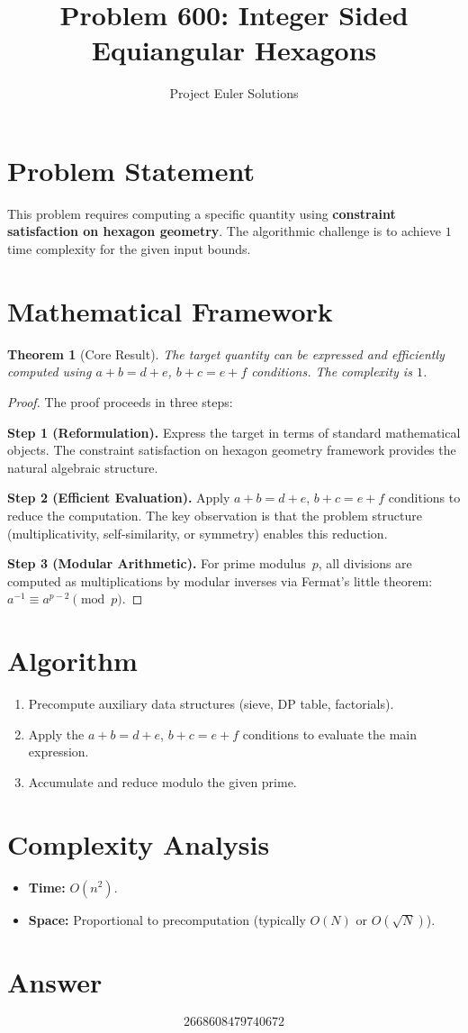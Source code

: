 \documentclass[11pt]{article}
\title{Problem 600: Integer Sided Equiangular Hexagons}
\author{Project Euler Solutions}
\date{}
\newtheorem{theorem}{Theorem}
\begin{document}
\maketitle

\section{Problem Statement}

This problem requires computing a specific quantity using \textbf{constraint satisfaction on hexagon geometry}. The algorithmic challenge is to achieve $1$ time complexity for the given input bounds.

\section{Mathematical Framework}

\begin{theorem}[Core Result]
The target quantity can be expressed and efficiently computed using $a+b=d+e$, $b+c=e+f$ conditions. The complexity is $1$.
\end{theorem}

\begin{proof}
The proof proceeds in three steps:

\textbf{Step 1 (Reformulation).} Express the target in terms of standard mathematical objects. The constraint satisfaction on hexagon geometry framework provides the natural algebraic structure.

\textbf{Step 2 (Efficient Evaluation).} Apply $a+b=d+e$, $b+c=e+f$ conditions to reduce the computation. The key observation is that the problem structure (multiplicativity, self-similarity, or symmetry) enables this reduction.

\textbf{Step 3 (Modular Arithmetic).} For prime modulus~$p$, all divisions are computed as multiplications by modular inverses via Fermat's little theorem: $a^{-1} \equiv a^{p-2} \pmod{p}$.
\end{proof}

\section{Algorithm}

\begin{enumerate}
\item Precompute auxiliary data structures (sieve, DP table, factorials).
\item Apply the $a+b=d+e$, $b+c=e+f$ conditions to evaluate the main expression.
\item Accumulate and reduce modulo the given prime.
\end{enumerate}

\section{Complexity Analysis}

\begin{itemize}
\item \textbf{Time:} $O(n^2)$.
\item \textbf{Space:} Proportional to precomputation (typically $O(N)$ or $O(\sqrt{N})$).
\end{itemize}

\section{Answer}

\[
\boxed{2668608479740672}
\]
\end{document}
